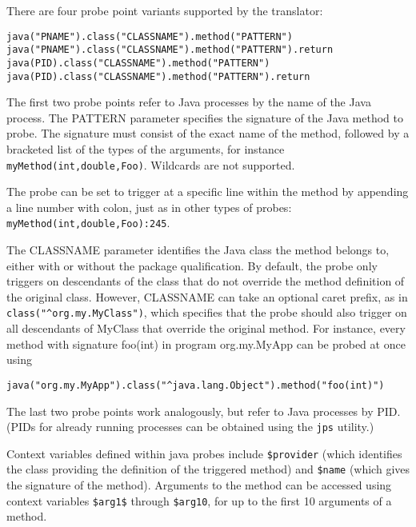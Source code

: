 \documentclass[twoside,english]{article}
\newenvironment{vindent}
{\begin{list}{}{\setlength{\listparindent}{6pt}}
\item[]}
{\end{list}}
\begin{document}
There are four probe point variants supported by the translator:
\begin{vindent}
\begin{verbatim}
java("PNAME").class("CLASSNAME").method("PATTERN")
java("PNAME").class("CLASSNAME").method("PATTERN").return
java(PID).class("CLASSNAME").method("PATTERN")
java(PID).class("CLASSNAME").method("PATTERN").return
\end{verbatim}
\end{vindent}

The first two probe points refer to Java processes by the name of the
Java process. The PATTERN parameter specifies the signature of the
Java method to probe. The signature must consist of the exact name of
the method, followed by a bracketed list of the types of the
arguments, for instance \texttt{myMethod(int,double,Foo)}. Wildcards
are not supported.

The probe can be set to trigger at a specific line within the method
by appending a line number with colon, just as in other types of
probes: \texttt{myMethod(int,double,Foo):245}.

The CLASSNAME parameter identifies the Java class the method belongs
to, either with or without the package qualification. By default, the
probe only triggers on descendants of the class that do not override
the method definition of the original class. However, CLASSNAME can
take an optional caret prefix, as in
\verb+class("^org.my.MyClass")+, which specifies that the probe
should also trigger on all descendants of MyClass that override the
original method. For instance, every method with signature foo(int) in
program org.my.MyApp can be probed at once using
\begin{vindent}
\begin{verbatim}
java("org.my.MyApp").class("^java.lang.Object").method("foo(int)")
\end{verbatim}
\end{vindent}

The last two probe points work analogously, but refer to Java
processes by PID. (PIDs for already running processes can be obtained
using the \texttt{jps} utility.)

Context variables defined within java probes include \verb+$provider+
(which identifies the class providing the definition of the triggered
method) and \verb+$name+ (which gives the signature of the method).
Arguments to the method can be accessed using context variables
\verb+$arg1$+ through \verb+$arg10+, for up to the first 10 arguments
of a method.
\end{document}
